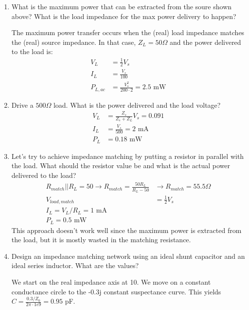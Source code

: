\begin{enumerate}[label=(\alph*)]
    \item What is the maximum power that can be extracted from the soure shown above? What is the load impedance for the max power delivery to happen?

    The maximum power transfer occurs when the (real) load impedance matches the (real) source impedance. In that case, $Z_L = 50 \Omega$ and the power delivered to the load is:
    \begin{align*}
        V_L &= \frac{1}{2} V_s \\
        I_L &= \frac{V_s}{100} \\
        P_{L,ac} &= \frac{V_s^2}{200 \cdot 2} = 2.5 \text{ mW}
    \end{align*}

    \item Drive a $500\Omega$ load. What is the power delivered and the load voltage?
    \begin{align*}
        V_L &= \frac{Z_s}{Z_s + Z_L} V_s = 0.091 \\
        I_L &= \frac{V_s}{500} = 2 \text{ mA} \\
        P_L &= 0.18 \text{ mW}
    \end{align*}

    \item Let's try to achieve impedance matching by putting a resistor in parallel with the load. What should the resistor value be and what is the actual power delivered to the load?
    \begin{align*}
        R_{match} || R_L = 50 \rightarrow R_{match} = \frac{50 R_L}{R_L - 50} &\rightarrow R_{match} = 55.5 \Omega \\
        V_{load,match} &= \frac{1}{2} V_s \\
        I_L = V_L/R_L = 1 \text{ mA} \\
        P_L = 0.5 \text{ mW}
    \end{align*}
    This approach doesn't work well since the maximum power is extracted from the load, but it is mostly wasted in the matching resistance.

    \item Design an impedance matching network using an ideal shunt capacitor and an ideal series inductor. What are the values?

    We start on the real impedance axis at 10. We move on a constant conductance circle to the -0.3j constant suspectance curve.
    This yields $C = \frac{0.3 / Z_0}{2 \pi \cdot 1e9} = 0.95$ pF.


\end{enumerate}
